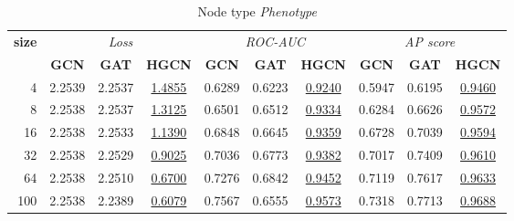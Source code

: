 \begin{table}
    \begin{subtable}[t]{\textwidth}
        \centering
        \begin{tabular}{r|ccc|ccc|ccc}   
        \toprule
            \multirow{2}{*}{\textbf{size}} & \multicolumn{3}{c|}{\textit{Loss}} & \multicolumn{3}{c|}{\textit{ROC-AUC}} & \multicolumn{3}{c}{\textit{AP score}} \\
                & \textbf{GCN} & \textbf{GAT} & \textbf{HGCN} & \textbf{GCN} & \textbf{GAT} & \textbf{HGCN} & \textbf{GCN} & \textbf{GAT} & \textbf{HGCN} \\
            \midrule
            4 & 2.2539 & 2.2537 & \underline{1.4855} & 0.6289 & 0.6223 & \underline{0.9240} & 0.5947 & 0.6195 & \underline{0.9460} \\
            8 & 2.2538 & 2.2537 & \underline{1.3125} & 0.6501 & 0.6512 & \underline{0.9334} & 0.6284 & 0.6626 & \underline{0.9572} \\
            16 & 2.2538 & 2.2533 & \underline{1.1390} & 0.6848 & 0.6645 & \underline{0.9359} & 0.6728 & 0.7039 & \underline{0.9594} \\
            32 & 2.2538 & 2.2529 & \underline{0.9025} & 0.7036 & 0.6773 & \underline{0.9382} & 0.7017 & 0.7409 & \underline{0.9610} \\
            64 & 2.2538 & 2.2510 & \underline{0.6700} & 0.7276 & 0.6842 & \underline{0.9452} & 0.7119 & 0.7617 & \underline{0.9633} \\
            100 & 2.2538 & 2.2389 & \underline{0.6079} & 0.7567 & 0.6555 & \underline{0.9573} & 0.7318 & 0.7713 & \underline{0.9688} \\
            \bottomrule
        \end{tabular}
        \caption{Node type \textit{Phenotype}}
    \end{subtable}
\end{table}
